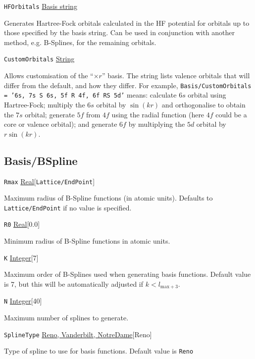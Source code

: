 \documentclass{report}
\begin{document}
\texttt{HFOrbitals} \uline{Basis string}
\begin{adjustwidth}{1cm}{}
Generates Hartree-Fock orbitals calculated in the HF potential for orbitals up to those specified by the basis string. Can be used in conjunction with another method, e.g. B-Splines, for the remaining orbitals.
\end{adjustwidth}

\texttt{CustomOrbitals} \uline{String}
\begin{adjustwidth}{1cm}{}
Allows customisation of the ``$\times r$'' basis. The string lists valence orbitals that will differ from the default, and how they differ. For example, \texttt{Basis/CustomOrbitals = '6s, 7s S 6s, 5f R 4f, 6f RS 5d'} means: calculate $6s$ orbital using Hartree-Fock; multiply the $6s$ orbital by $\sin(kr)$ and orthogonalise to obtain the $7s$ orbital; generate $5f$ from $4f$ using the radial function (here $4f$ could be a core or valence orbital); and generate $6f$ by multiplying the $5d$ orbital by $r\sin(kr)$.
\end{adjustwidth}

\subsection{Basis/BSpline}

\texttt{Rmax} \uline{Real}[\texttt{Lattice/EndPoint}]
\begin{adjustwidth}{1cm}{}
Maximum radius of B-Spline functions (in atomic units). Defaults to \texttt{Lattice/EndPoint} if no 
value is specified.
\end{adjustwidth}

\texttt{R0} \uline{Real}[0.0]
\begin{adjustwidth}{1cm}{}
Minimum radius of B-Spline functions in atomic units. 
\end{adjustwidth}

\texttt{K} \uline{Integer}[7]
\begin{adjustwidth}{1cm}{}
Maximum order of B-Splines used when generating basis functions. Default value is 7, but this will be
automatically adjusted if $k < l_{\mathrm{max} + 3}$.
\end{adjustwidth}

\texttt{N} \uline{Integer}[40]
\begin{adjustwidth}{1cm}{}
Maximum number of splines to generate.
\end{adjustwidth}

\texttt{SplineType} \uline{Reno, Vanderbilt, NotreDame}[Reno]
\begin{adjustwidth}{1cm}{}
Type of spline to use for basis functions. Default value is \texttt{Reno}
\end{adjustwidth}
\end{document}
